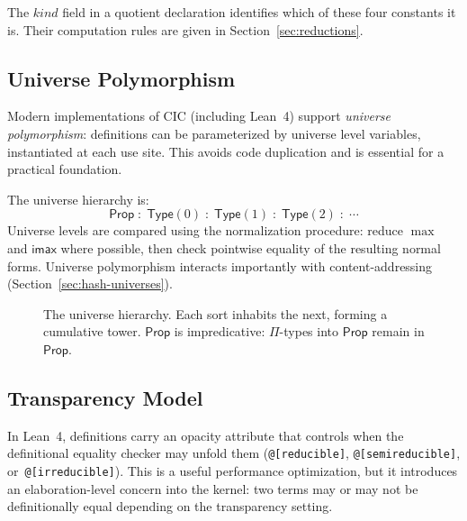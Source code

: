 \documentclass[11pt]{article}
\theoremstyle{definition}
\theoremstyle{plain}
\theoremstyle{remark}
\newcommand{\Prop}{\textsf{Prop}}
\newcommand{\Type}{\textsf{Type}}
\begin{document}
The $\mathit{kind}$ field in a quotient declaration identifies which of these four constants it is.
Their computation rules are given in Section~\ref{sec:reductions}.

\subsection{Universe Polymorphism}
\label{sec:universes}

Modern implementations of CIC (including Lean~4) support \emph{universe polymorphism}:
definitions can be parameterized by universe level variables, instantiated at each use site.
This avoids code duplication and is essential for a practical foundation.

The universe hierarchy is:
\[
  \Prop \;:\; \Type(0) \;:\; \Type(1) \;:\; \Type(2) \;:\; \cdots
\]
Universe levels are compared using the normalization procedure: reduce $\max$ and $\textsf{imax}$
where possible, then check pointwise equality of the resulting normal forms.
Universe polymorphism interacts importantly with content-addressing (Section~\ref{sec:hash-universes}).

\begin{figure}[t]
\centering
{}
\caption{The universe hierarchy. Each sort inhabits the next, forming a cumulative tower.
$\Prop$ is impredicative: $\Pi$-types into $\Prop$ remain in $\Prop$.}
\label{fig:universes}
\end{figure}

\subsection{Transparency Model}
\label{sec:transparency}

In Lean~4, definitions carry an opacity attribute
that controls when the definitional equality checker may unfold them
(\texttt{@[reducible]}, \texttt{@[semireducible]}, or~\texttt{@[irreducible]}).
This is a useful performance optimization, but it introduces an
elaboration-level concern into the kernel: two terms may or may not be
definitionally equal depending on the transparency setting.
\end{document}
